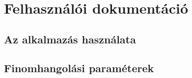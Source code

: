 \chapter{Felhasználói dokumentáció}

\section{Az alkalmazás használata}

\section{Finomhangolási paraméterek}